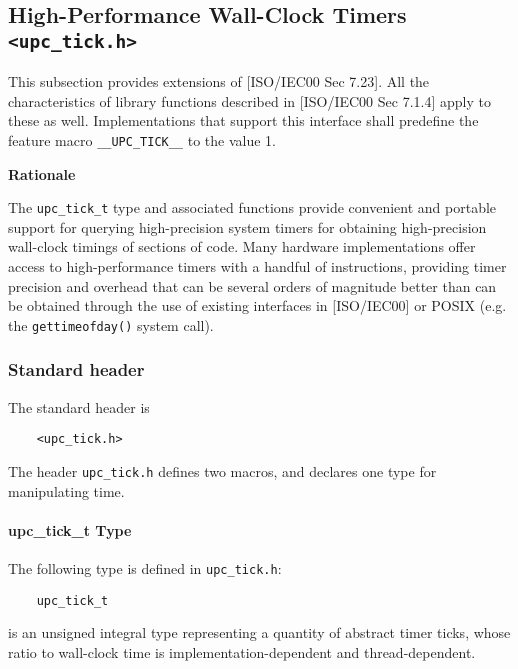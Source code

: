 \cbstart
\subsection{High-Performance Wall-Clock Timers {\tt <upc\_tick.h>}}
\label{upc-tick}

\npf This subsection provides extensions of [ISO/IEC00 Sec 7.23].
    All the characteristics of library functions described
    in [ISO/IEC00 Sec 7.1.4] apply to these as well.  Implementations
    that support this interface shall predefine the feature macro
    {\tt \_\_UPC\_TICK\_\_} to the value 1.

{\bf Rationale}

\np The {\tt upc\_tick\_t} type and associated functions 
provide convenient and portable support for
querying high-precision system timers for obtaining high-precision wall-clock timings of
sections of code. Many hardware implementations offer access to high-performance timers
with a handful of instructions, providing timer precision and overhead that can
be several orders of magnitude better than can be obtained through the use of
existing interfaces in [ISO/IEC00] or POSIX (e.g. the {\tt gettimeofday()} system call).


\subsubsection{Standard header}

\npf The standard header is

\begin{verbatim}
    <upc_tick.h> 
\end{verbatim}

\np The header {\tt upc\_tick.h} defines two macros, and declares one type for manipulating time.

\paragraph{upc\_tick\_t Type}

\npf The following type is defined in {\tt upc\_tick.h}:

\begin{verbatim}
    upc_tick_t 
\end{verbatim}

 is an unsigned integral type representing a quantity of abstract timer ticks,
whose ratio to wall-clock time is implementation-dependent and thread-dependent.


